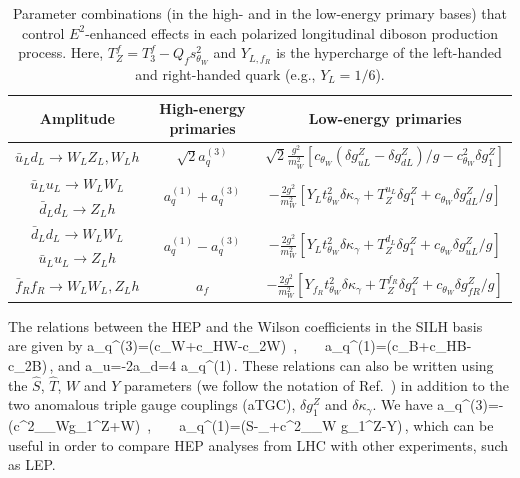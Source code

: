 \documentclass[../report.tex]{subfiles}
\begin{document}
\begin{table}[t]
\begin{center}
\begin{tabular}{c|c|c}%
Amplitude& High-energy primaries& Low-energy primaries  \\\hline
\rule[-1.4em]{0pt}{3.2em}$\bar u_L d_L\to W_LZ_L,W_Lh$ & $\sqrt{2}a_q^{(3)}$ & $ \displaystyle\sqrt{2}\frac{g^2}{m_W^2}\left[c_{\theta_W}({\delta g^Z_{uL}}-{\delta g^Z_{dL}})/g-c_{\theta_W}^2{\delta g_1^Z} \right]$ \\
\hline
\rule[-.6em]{0pt}{1.7em}$\bar u_L u_L\to W_LW_L$& \multirow{ 2}{*}{$a_q^{(1)}+a_q^{(3)}$}& \multirow{ 2}{*}{$\displaystyle-\frac{2g^2}{m_W^2}\left[Y_L t^2_{\theta_W}{\delta\kappa_\gamma}+T_Z^{u_L}{\delta g_1^Z}+c_{\theta_W}{\delta g^Z_{dL}}
 /g\right]$}\\
\rule[-.55em]{0pt}{1.45em}$\bar d_L d_L\to Z_Lh$& &\\
\hline
\rule[-.6em]{0pt}{1.7em}$\bar d_L d_L\to W_LW_L$& \multirow{ 2}{*}{$a_q^{(1)}-a_q^{(3)}$}& \multirow{ 2}{*}{$\displaystyle-\frac{2g^2}{m_W^2}\left[Y_L t^2_{\theta_W}{\delta\kappa_\gamma}+T_Z^{d_L}{\delta g_1^Z}+c_{\theta_W}{\delta g^Z_{uL}}
/g\right]$}\\
\rule[-.55em]{0pt}{1.45em}$\bar u_L u_L\to Z_Lh$& & \\
\hline
\rule[-1.2em]{0pt}{3.em}$\bar f_R f_R\to W_LW_L,Z_Lh$& $a_{f}$& $\displaystyle-\frac{2g^2}{m_W^2}\left[Y_{f_R} t^2_{\theta_W}{\delta\kappa_\gamma}+T_Z^{f_R}{\delta g_1^Z}+c_{\theta_W}{\delta g^Z_{fR}}/g\right]$
 \end{tabular}
  \caption{Parameter combinations (in the high- and in the low-energy primary bases) that control $E^2$-enhanced effects in each polarized longitudinal diboson production process. Here, $T_Z^f=T_3^f-Q_fs^2_{\theta_W}$ and $Y_{L,f_R}$ is the hypercharge of the left-handed and right-handed quark (e.g., $Y_L=1/6$).}
\label{Wilsons}
\end{center}
\end{table}



The relations between the HEP and the Wilson coefficients in the SILH basis~\cite{Giudice:2007fh} are given by
\be
 a_q^{(3)}=(c_W+c_{HW}-c_{2W})\ ,\ \  \ \
  a_q^{(1)}=(c_B+c_{HB}-c_{2B})\,, \label{a2c}
\ee
and
\be
a_u=-2a_d=4 a_q^{(1)}\,.
\label{unifersal}
\ee
These relations can also be written using  the $\hat S$, $\hat T$, $W$ and $Y$ parameters (we follow the notation of Ref.~\cite{Barbieri:2004qk}) in addition to the two anomalous  triple gauge couplings (aTGC), $\delta g_1^Z$ and  $\delta \kappa_\gamma$. We have
\be
 a_q^{(3)}=-\left(c^2_{\theta_W}\delta g_1^Z+W\right)\ ,\ \  \ \
  a_q^{(1)}=\left(\hat S-\delta\kappa_\gamma+c^2_{\theta_W} \delta g_1^Z-Y\right)\,,
\label{heptosilh}  
\ee
which  can  be useful in order to  compare HEP analyses  from  LHC  with  other experiments, such as LEP. 
\end{document}
